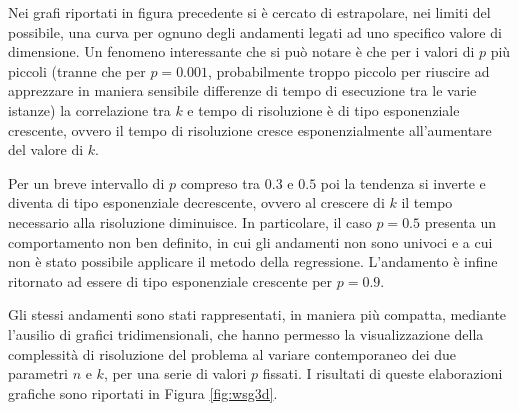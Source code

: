 Nei grafi riportati in figura precedente si è cercato di estrapolare, nei limiti del possibile, una curva per ognuno degli andamenti legati ad uno specifico valore di dimensione. Un fenomeno interessante che si può notare è che per i valori di $p$ più piccoli (tranne che per $p=0.001$, probabilmente troppo piccolo per riuscire ad apprezzare in maniera sensibile differenze di tempo di esecuzione tra le varie istanze) la correlazione tra $k$ e tempo di risoluzione è di tipo esponenziale crescente, ovvero il tempo di risoluzione cresce esponenzialmente all'aumentare del valore di $k$. 

Per un breve intervallo di $p$ compreso tra $0.3$ e $0.5$ poi la tendenza si inverte e diventa di tipo esponenziale decrescente, ovvero al crescere di $k$ il tempo necessario alla risoluzione diminuisce. In particolare, il caso $p=0.5$ presenta un comportamento non ben definito, in cui gli andamenti non sono univoci e a cui non è stato possibile applicare il metodo della regressione. L'andamento è infine ritornato ad essere di tipo esponenziale crescente per $p=0.9$.

Gli stessi andamenti sono stati rappresentati, in maniera più compatta, mediante l'ausilio di grafici tridimensionali, che hanno permesso la visualizzazione della complessità di risoluzione del problema al variare contemporaneo dei due parametri $n$ e $k$, per una serie di valori $p$ fissati. I risultati di queste elaborazioni grafiche sono riportati in Figura \ref{fig:wsg3d}.

